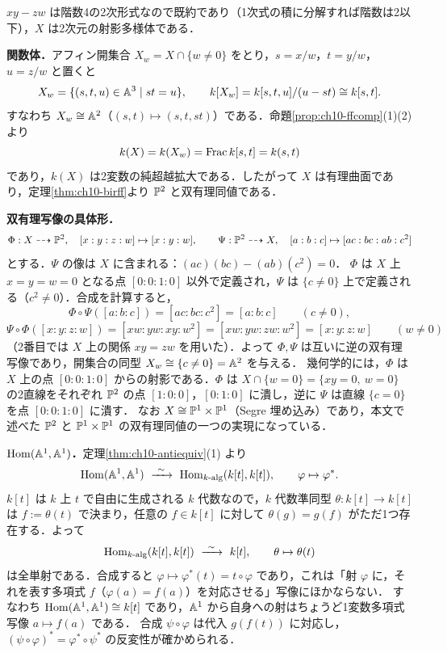 $xy-zw$ は階数4の2次形式なので既約であり（1次式の積に分解すれば階数は2以下），$X$ は2次元の射影多様体である．

\textbf{関数体．}アフィン開集合 $X_w=X\cap\{w\neq0\}$ をとり，$s=x/w$，$t=y/w$，$u=z/w$ と置くと
\[
  X_w=\{(s,t,u)\in\mathbb{A}^3\mid st=u\},\qquad k[X_w]=k[s,t,u]/(u-st)\cong k[s,t].
\]
すなわち $X_w\cong\mathbb{A}^2$（$(s,t)\mapsto(s,t,st)$）である．命題\ref{prop:ch10-ffcomp}(1)(2) より
\[
  k(X)=k(X_w)=\operatorname{Frac} k[s,t]=k(s,t)
\]
であり，$k(X)$ は2変数の純超越拡大である．したがって $X$ は有理曲面であり，定理\ref{thm:ch10-birff}より $\mathbb{P}^2$ と双有理同値である．

\textbf{双有理写像の具体形．}
\[
  \Phi:X\dashrightarrow\mathbb{P}^2,\quad [x:y:z:w]\mapsto[x:y:w],\qquad
  \Psi:\mathbb{P}^2\dashrightarrow X,\quad [a:b:c]\mapsto[ac:bc:ab:c^2]
\]
とする．$\Psi$ の像は $X$ に含まれる：$(ac)(bc)-(ab)(c^2)=0$．
$\Phi$ は $X$ 上 $x=y=w=0$ となる点 $[0:0:1:0]$ 以外で定義され，$\Psi$ は $\{c\neq0\}$ 上で定義される（$c^2\neq0$）．合成を計算すると，
\[
  \Phi\circ\Psi([a:b:c])=[ac:bc:c^2]=[a:b:c]\qquad(c\neq0),
\]
\[
  \Psi\circ\Phi([x:y:z:w])=[xw:yw:xy:w^2]=[xw:yw:zw:w^2]=[x:y:z:w]\qquad(w\neq0)
\]
（2番目では $X$ 上の関係 $xy=zw$ を用いた）．よって $\Phi,\Psi$ は互いに逆の双有理写像であり，開集合の同型 $X_w\cong\{c\neq0\}=\mathbb{A}^2$ を与える．
幾何学的には，$\Phi$ は $X$ 上の点 $[0:0:1:0]$ からの射影である．$\Phi$ は $X\cap\{w=0\}=\{xy=0,\ w=0\}$ の2直線をそれぞれ $\mathbb{P}^2$ の点 $[1:0:0]$，$[0:1:0]$ に潰し，逆に $\Psi$ は直線 $\{c=0\}$ を点 $[0:0:1:0]$ に潰す．
なお $X\cong\mathbb{P}^1\times\mathbb{P}^1$（Segre 埋め込み）であり，本文で述べた $\mathbb{P}^2$ と $\mathbb{P}^1\times\mathbb{P}^1$ の双有理同値の一つの実現になっている．

\textbf{$\operatorname{Hom}(\mathbb{A}^1,\mathbb{A}^1)$．}定理\ref{thm:ch10-antiequiv}(1) より
\[
  \Hom(\A^1,\A^1)\ \xrightarrow{\ \sim\ }\ \Hom_{k\text{-alg}}(k[t],k[t]),\qquad \varphi\mapsto\varphi^*.
\]
$k[t]$ は $k$ 上 $t$ で自由に生成される $k$ 代数なので，$k$ 代数準同型 $\theta:k[t]\to k[t]$ は $f:=\theta(t)$ で決まり，任意の $f\in k[t]$ に対して $\theta(g)=g(f)$ がただ1つ存在する．よって
\[
  \Hom_{k\text{-alg}}(k[t],k[t])\ \xrightarrow{\ \sim\ }\ k[t],\qquad \theta\mapsto\theta(t)
\]
は全単射である．合成すると $\varphi\mapsto\varphi^*(t)=t\circ\varphi$ であり，これは「射 $\varphi$ に，それを表す多項式 $f$（$\varphi(a)=f(a)$）を対応させる」写像にほかならない．
すなわち $\operatorname{Hom}(\mathbb{A}^1,\mathbb{A}^1)\cong k[t]$ であり，$\mathbb{A}^1$ から自身への射はちょうど1変数多項式写像 $a\mapsto f(a)$ である．
合成 $\psi\circ\varphi$ は代入 $g(f(t))$ に対応し，$(\psi\circ\varphi)^*=\varphi^*\circ\psi^*$ の反変性が確かめられる．

